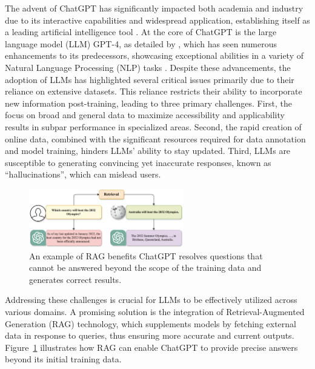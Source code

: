 The advent of ChatGPT has significantly impacted both academia and industry due to its interactive capabilities and widespread application, establishing itself as a leading artificial intelligence tool \cite{DBLP:journals/corr/abs-2305-18486, DBLP:journals/corr/abs-2306-04504, DBLP:journals/corr/abs-2402-11203}. At the core of ChatGPT is the large language model (LLM) GPT-4, as detailed by \cite{achiam2023gpt}, which has seen numerous enhancements to its predecessors, showcasing exceptional abilities in a variety of Natural Language Processing (NLP) tasks \cite{DBLP:conf/ai/LaskarHH20}. Despite these advancements, the adoption of LLMs has highlighted several critical issues primarily due to their reliance on extensive datasets. This reliance restricts their ability to incorporate new information post-training, leading to three primary challenges. First, the focus on broad and general data to maximize accessibility and applicability results in subpar performance in specialized areas. Second, the rapid creation of online data, combined with the significant resources required for data annotation and model training, hinders LLMs' ability to stay updated. Third, LLMs are susceptible to generating convincing yet inaccurate responses, known as ``hallucinations'', which can mislead users.

\begin{figure}[t]
	\includegraphics[width=0.6\textwidth]{Figures/RAG_example.png}
	\caption{An example of RAG benefits ChatGPT resolves questions that cannot be answered beyond the scope of the training data and generates correct results.}
	\label{fig:ragexample}
\end{figure}



Addressing these challenges is crucial for LLMs to be effectively utilized across various domains. A promising solution is the integration of Retrieval-Augmented Generation (RAG) technology, which supplements models by fetching external data in response to queries, thus ensuring more accurate and current outputs. Figure~\ref{fig:ragexample} illustrates how RAG can enable ChatGPT to provide precise answers beyond its initial training data.

